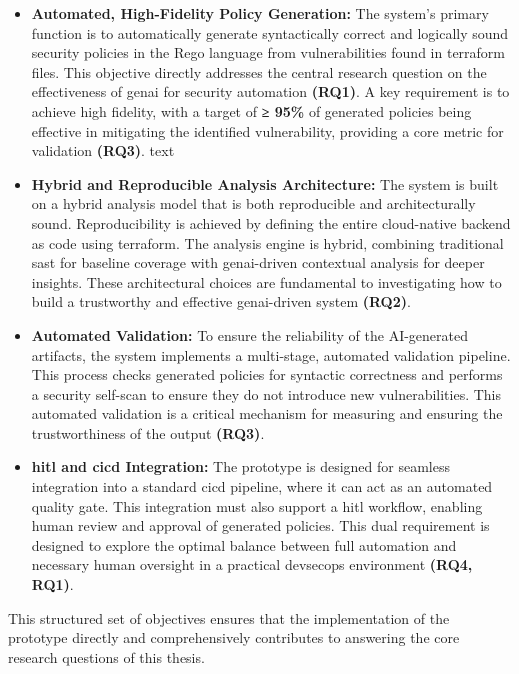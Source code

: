 \begin{itemize}
\item \textbf{Automated, High-Fidelity Policy Generation:} The system's primary function is to automatically generate syntactically correct and logically sound security policies in the Rego language from vulnerabilities found in \gls{terraform} files. This objective directly addresses the central research question on the effectiveness of \gls{genai} for security automation \textbf{(RQ1)}. A key requirement is to achieve high fidelity, with a target of \textbf{≥ 95\%} of generated policies being effective in mitigating the identified vulnerability, providing a core metric for validation \textbf{(RQ3)}.
text
\item \textbf{Hybrid and Reproducible Analysis Architecture:} The system is built on a hybrid analysis model that is both reproducible and architecturally sound. Reproducibility is achieved by defining the entire \gls{cloud-native} backend as code using \gls{terraform}. The analysis engine is hybrid, combining traditional \gls{sast} for baseline coverage with \gls{genai}-driven contextual analysis for deeper insights. These architectural choices are fundamental to investigating how to build a trustworthy and effective \gls{genai}-driven system \textbf{(RQ2)}.

\item \textbf{Automated Validation:} To ensure the reliability of the AI-generated artifacts, the system implements a multi-stage, automated validation pipeline. This process checks generated policies for syntactic correctness and performs a security self-scan to ensure they do not introduce new vulnerabilities. This automated validation is a critical mechanism for measuring and ensuring the trustworthiness of the output \textbf{(RQ3)}.

\item \textbf{\gls{hitl} and \gls{cicd} Integration:} The prototype is designed for seamless integration into a standard \gls{cicd} pipeline, where it can act as an automated quality gate. This integration must also support a \gls{hitl} workflow, enabling human review and approval of generated policies. This dual requirement is designed to explore the optimal balance between full automation and necessary human oversight in a practical \gls{devsecops} environment \textbf{(RQ4, RQ1)}.
\end{itemize}

This structured set of objectives ensures that the implementation of the prototype directly and comprehensively contributes to answering the core research questions of this thesis.

